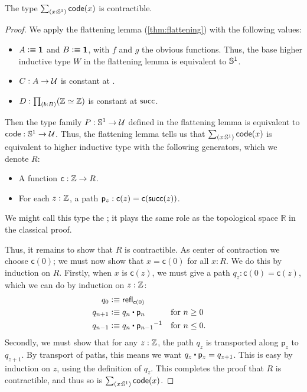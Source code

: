 \begin{lem}
  The type $\sm{x:\Sn^1}\code(x)$ is contractible.
\end{lem}
\begin{proof}
  We apply the flattening lemma (\autoref{thm:flattening}) with the following values:
  \begin{itemize}
  \item $A\vcentcolon\equiv\mathbf{1}$ and $B\vcentcolon\equiv\mathbf{1}$, with $f$ and $g$ the obvious functions.
    Thus, the base higher inductive type $W$ in the flattening lemma is equivalent to $\mathbb{S}^1$.
  \item $C:A\to\mathcal{U}$ is constant at \Z.
  \item $D:\prd{b:B} (\eqv{\Z}{\Z})$ is constant at $\mathsf{succ}$.
  \end{itemize}
  Then the type family $P:\mathbb{S}^1\to\mathcal{U}$ defined in the flattening lemma is equivalent to $\mathsf{code}:\mathbb{S}^1\to\mathcal{U}$.
  Thus, the flattening lemma tells us that $\sm{x:\Sn^1}\code(x)$ is equivalent to higher inductive type with the following generators, which we denote $R$:
  \begin{itemize}
  \item A function $\mathsf{c}: \mathbb{Z} \to R$.
  \item For each $z:\mathbb{Z}$, a path $\mathsf{p}_z:\mathsf{c}(z) = \mathsf{c}(\mathsf{succ}(z))$.
  \end{itemize}
  We might call this type the ;
  it plays the same role as the topological space $\mathbb{R}$ in the classical proof.

  Thus, it remains to show that $R$ is contractible.
  As center of contraction we choose $\mathsf{c}(0)$; we must now show that $x=\mathsf{c}(0)$ for all $x:R$.
  We do this by induction on $R$.
  Firstly, when $x$ is $\mathsf{c}(z)$, we must give a path $q_z:\mathsf{c}(0) = \mathsf{c}(z)$, which we can do by induction on $z:\mathbb{Z}$:
  \begin{align*}
    q_0 &\defeq \refl{\mathsf{c}(0)}\\
    q_{n+1} &\defeq q_n \ct \mathsf{p}_n & &\text{for $n\ge 0$}\\
    q_{n-1} &\defeq q_n \ct \opp{\mathsf{p}_{n-1}} & &\text{for $n\le 0$.}
  \end{align*}
  Secondly, we must show that for any $z:\mathbb{Z}$, the path $q_z$ is transported along $\mathsf{p}_z$ to $q_{z+1}$.
  By transport of paths, this means we want $q_z \ct \mathsf{p}_z = q_{z+1}$.
  This is easy by induction on $z$, using the definition of $q_z$.
  This completes the proof that $R$ is contractible, and thus so is $\sm{x:\Sn^1}\code(x)$.
\end{proof}

